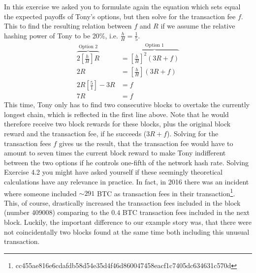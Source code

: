 \documentclass[12pt]{article}
\begin{document}
\begin{figure}[h!]
	\end{figure}
	In this exercise we asked you to formulate again the equation which sets equal the expected payoffs of Tony's options, but then solve for the transaction fee $f$. This to find the resulting relation between $f$ and $R$ if we assume the relative hashing power of Tony to be 20\%, i.e. $\frac{h}{H} = \frac{1}{5}$.
	\begin{align*}
		\overbrace{2 \left[\frac{h}{H}\right]R}^{\text{Option 2}}&=\overbrace{\left[\frac{h}{H}\right]^2 (3R+f)}^{\text{Option 1}}\\
		2R&=\left[\frac{h}{H}\right] (3R+f)\\
		2R\left[\frac{5}{1}\right]-3R&=f\\
		7R&=f
	\end{align*}
	This time, Tony only has to find two consecutive blocks to overtake the currently longest chain, which is reflected in the first line above. Note that he would therefore receive two block rewards for these blocks, plus the original block reward and the transaction fee, if he succeeds ($3R + f$). Solving for the transaction fees $f$ gives us the result, that the transaction fee would have to amount to seven times the current block reward to make Tony indifferent between the two options if he controls one-fifth of the network hash rate.
	\newpage
	Solving Exercise 4.2 you might have asked yourself if these seemingly theoretical calculations have any relevance in practice. In fact, in 2016 there was an incident where someone included $\sim 291$ BTC as transaction fees in their transaction\footnote{cc455ae816e6cdafdb58d54e35d4f46d860047458eacf1c7405dc634631c570d}. This, of course, drastically increased the transaction fees included in the block (number 409008) comparing to the $0.4$ BTC transaction fees included in the next block. Luckily, the important difference to our example story was, that there were not coincidentally two blocks found at the same time both including this unusual transaction.\par 
	
\end{document}
